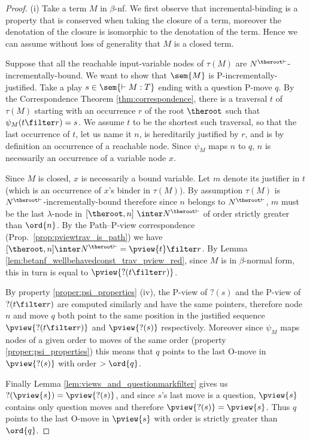 \begin{proof}
\noindent (i) Take a term $M$ in $\beta$-nf.
We first observe that incremental-binding is a property that is conserved when taking the closure of a term, moreover the denotation of the closure is isomorphic to the denotation of the term. Hence we can assume without loss of generality that $M$ is a closed term.

Suppose that all the reachable input-variable nodes of $\tau(M)$ are $N^{\theroot\vdash}$-incrementally-bound. We want to show 
that $\sem{M}$ is P-incrementally-justified. Take a play $s \in \sem{\vdash M : T}$ ending with a question
P-move $q$. By the Correspondence Theorem \ref{thm:correspondence},
there is a traversal $t$ of $\tau(M)$ starting with an occurrence
$r$ of the root $\theroot$ such that $\psi_M (t\filter r) = s$. We
assume $t$ to be the shortest such traversal, so that the last
occurrence of $t$, let us name it $n$, is hereditarily justified
by $r$, and is by definition an occurrence of a reachable node.
Since $\psi_M$ maps $n$ to $q$, $n$ is necessarily an
occurrence of a variable node $x$. 

Since $M$ is closed, $x$ is necessarily a bound variable. Let $m$ denote its justifier
in $t$ (which is an occurrence of $x$'s binder in $\tau(M)$). By
assumption $\tau(M)$ is $N^{\theroot\vdash}$-incrementally-bound
therefore since $n$ belongs to $N^{\theroot\vdash}$, $m$ must be
the last $\lambda$-node in $[\theroot,n]\ \inter
N^{\theroot\vdash}$ of order strictly greater than $\ord{n}$.
By the Path--P-view correspondence (Prop.\
\ref{prop:pviewtrav_is_path}) we have $[\theroot,n] \inter
N^{\theroot\vdash} = \pview{t} \filter r$. By Lemma
\ref{lem:betanf_wellbehavedconst_trav_pview_red}, since $M$ is
in $\beta$-normal form, this in turn is
equal to $\pview{?(t \filter r)}$.


By property \ref{proper:psi_properties} (iv), the P-view of
$?(s)$ and the P-view of $?(t \filter r)$ are computed similarly
and have the same pointers, therefore node $n$ and move $q$ both
point to the same position in the justified sequence
$\pview{?(t\filter r)}$ and $\pview{?(s)}$ respectively.
Moreover since $\psi_M$ maps nodes of a given order to moves of
the same order (property \ref{proper:psi_properties}) this means
that $q$ points to the last O-move in $\pview{?(s)}$ with order
$>\ord{q}$.

Finally Lemma \ref{lem:views_and_questionmarkfilter} gives us
$?(\pview{s}) = \pview{?(s)}$, and since $s$'s last move is a
question, $\pview{s}$ contains only question moves and therefore
$\pview{?(s)} = \pview{s}$. Thus $q$ points to the last O-move
in $\pview{s}$ with order is strictly greater than $\ord{q}$.
\smallskip


\end{proof}
